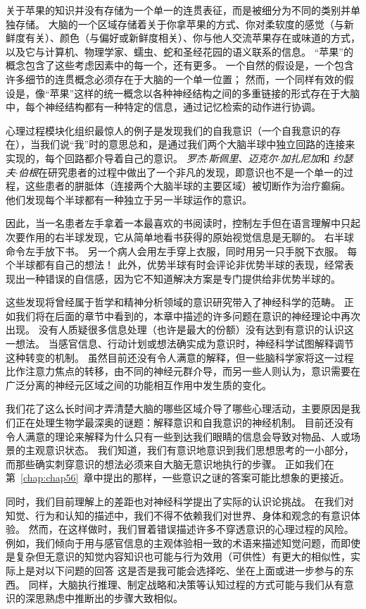 关于苹果的知识并没有存储为一个单一的连贯表征，而是被细分为不同的类别并单独存储。
大脑的一个区域存储着关于你拿苹果的方式、你对柔软度的感觉（与新鲜度有关）、颜色（与偏好或新鲜度相关）、你与他人交流苹果存在或味道的方式，以及它与计算机、物理学家、蠕虫、蛇和圣经花园的语义联系的信息。
“苹果”的概念包含了这些考虑因素中的每一个，还有更多。
一个自然的假设是，一个包含许多细节的连贯概念必须存在于大脑的一个单一位置；
然而，一个同样有效的假设是，像“苹果”这样的统一概念以各种神经结构之间的多重链接的形式存在于大脑中，每个神经结构都有一种特定的信息，通过记忆检索的动作进行协调。


心理过程模块化组织最惊人的例子是发现我们的自我意识（一个自我意识的存在），当我们说“我”时的意思总和，是通过我们两个大脑半球中独立回路的连接来实现的，每个回路都介导着自己的意识。
\textit{罗杰$\cdot$斯佩里}、\textit{迈克尔$\cdot$加扎尼加}和 \textit{约瑟夫$\cdot$伯根}在研究患者的过程中做出了一个非凡的发现，即意识也不是一个单一的过程，这些患者的胼胝体（连接两个大脑半球的主要区域）被切断作为治疗癫痫。
他们发现每个半球都有一种独立于另一半球运作的意识。


因此，当一名患者左手拿着一本最喜欢的书阅读时，控制左手但在语言理解中只起次要作用的右半球发现，它从简单地看书获得的原始视觉信息是无聊的。
右半球命令左手放下书。
另一个病人会用左手穿上衣服，同时用另一只手脱下衣服。 每个半球都有自己的想法！
此外，优势半球有时会评论非优势半球的表现，经常表现出一种错误的自信感，因为它不知道解决方案是专门提供给非优势半球的。


这些发现将曾经属于哲学和精神分析领域的意识研究带入了神经科学的范畴。
正如我们将在后面的章节中看到的，本章中描述的许多问题在意识的神经理论中再次出现。
没有人质疑很多信息处理（也许是最大的份额）没有达到有意识的认识这一想法。
当感官信息、行动计划或想法确实成为意识时，神经科学试图解释调节这种转变的机制。
虽然目前还没有令人满意的解释，但一些脑科学家将这一过程比作注意力焦点的转移，由不同的神经元群介导，而另一些人则认为，意识需要在广泛分离的神经元区域之间的功能相互作用中发生质的变化。


我们花了这么长时间才弄清楚大脑的哪些区域介导了哪些心理活动，主要原因是我们正在处理生物学最深奥的谜题：解释意识和自我意识的神经机制。
目前还没有令人满意的理论来解释为什么只有一些到达我们眼睛的信息会导致对物品、人或场景的主观意识状态。 
我们知道，我们有意识地意识到我们思想思考的一小部分，而那些确实刺穿意识的想法必须来自大脑无意识地执行的步骤。
正如我们在第~\ref{chap:chap56}~章中提出的那样，一些意识之谜的答案可能比想象的更接近。


同时，我们目前理解上的差距也对神经科学提出了实际的认识论挑战。
在我们对知觉、行为和认知的描述中，我们不得不依赖我们对世界、身体和观念的有意识体验。
然而，在这样做时，我们冒着错误描述许多不穿透意识的心理过程的风险。
例如，我们倾向于用与感官信息的主观体验相一致的术语来描述知觉问题，而即使是复杂但无意识的知觉内容知识也可能与行为效用（可供性）有更大的相似性，实际上是对以下问题的回答 这是否是我可能会选择吃、坐在上面或进一步参与的东西。
同样，大脑执行推理、制定战略和决策等认知过程的方式可能与我们从有意识的深思熟虑中推断出的步骤大致相似。


